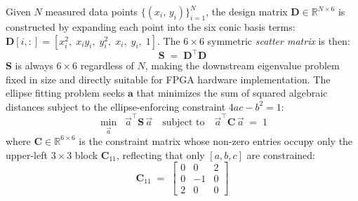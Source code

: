 \documentclass[colorlinks,upint,subscriptcorrection,varvw,hyphenate,balance,greek,russian,vietnamese,german]{asmeconf} %
\newcommand{\vect}[1]{\vec{#1}}
\begin{document}
Given $N$ measured data points $\{(x_i,\,y_i)\}_{i=1}^{N}$,
the design matrix $\mathbf{D} \in \mathbb{R}^{N \times 6}$ is
constructed by expanding each point into the six conic basis terms:
$\mathbf{D}[i,:] = [x_i^2,\; x_iy_i,\; y_i^2,\; x_i,\; y_i,\; 1]$.
The $6\times6$ symmetric \emph{scatter matrix} is then:
\begin{equation}
	\mathbf{S} \;=\; \mathbf{D}^\top \mathbf{D}
	\label{eq:scatter}
\end{equation}
$\mathbf{S}$ is always $6\times6$ regardless of $N$,
making the downstream eigenvalue problem fixed in size
and directly suitable for FPGA hardware implementation.
The ellipse fitting problem seeks $\mathbf{a}$ that minimizes
the sum of squared algebraic distances subject to the
ellipse-enforcing constraint $4ac - b^2 = 1$:
\begin{equation}
	\min_{\vect{a}} \;\;
	\vect{a}^\top \mathbf{S}\, \vect{a}
	\quad \text{subject to} \quad
	\vect{a}^\top \mathbf{C}\, \vect{a} \;=\; 1
	\label{eq:constrained}
\end{equation}
where $\mathbf{C} \in \mathbb{R}^{6\times6}$ is the constraint matrix
whose non-zero entries occupy only the upper-left $3\times3$ block
$\mathbf{C}_{11}$, reflecting that only $[a,b,c]$ are constrained:
\begin{equation}
	\mathbf{C}_{11} \;=\;
	\begin{bmatrix}
		0 & 0 & 2 \\
		0 & -1 & 0 \\
		2 & 0 & 0
	\end{bmatrix}
	\label{eq:C11}
\end{equation}
\end{document}
